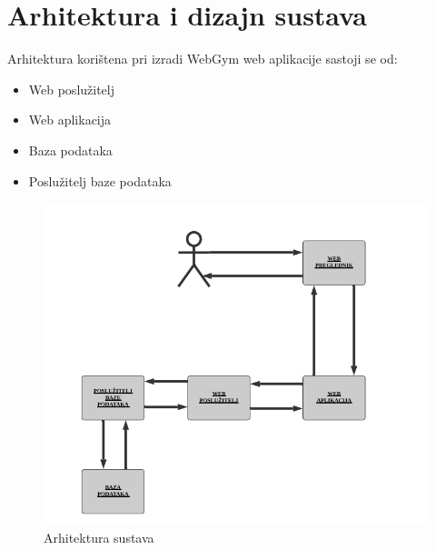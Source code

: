 \chapter{Arhitektura i dizajn sustava}
		
	
	Arhitektura korištena pri izradi WebGym web aplikacije sastoji se od:
	\begin{itemize}
		\item   Web poslužitelj
		\item 	Web aplikacija
		\item 	Baza podataka
		\item   Poslužitelj baze podataka	
	\end{itemize}
	
	\begin{figure}[H]
			\includegraphics[scale=1.0]{slike/arh.PNG} %
			\centering
			\caption{Arhitektura sustava}
			\label{fig:promjene}
		\end{figure}

